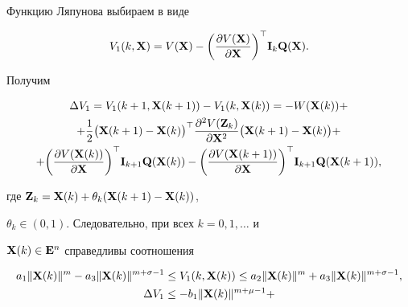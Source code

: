 \begin{pf}


Функцию Ляпунова выбираем в виде


\begin{equation}


V_1(k,\bold X)=V(\bold X)-


\bigg(\frac{\partial V(\bold X)}{\partial \bold X}\bigg)^\top \bold I_k


\bold Q(\bold X).


\end{equation}


Получим


\begin{multline*}


\Delta V_1=V_1(k+1, \bold X(k+1))-V_1(k, \bold X(k))=-W(\bold X(k))+\\


%


+\frac12 \big(\bold X(k+1)-\bold X(k)


\big)^\top \frac {\partial^2 V(\bold Z_k)}


{\partial \bold X^2}\big(\bold X(k+1)-\bold X(k) \big)+\\


%


+\bigg(\frac{\partial V(\bold X(k))}{\partial \bold X}\bigg)^\top


\bold I_{k+1} \bold Q(\bold X(k))-\bigg(\frac{\partial


V(\bold X(k+1))}{\partial \bold X}\bigg)^\top


\bold I_{k+1} \bold Q(\bold X(k+1)),


\end{multline*}


где $\bold Z_k= \bold X(k)+\theta_k (\bold X(k+1)-\bold X(k))$,


$\theta_k\in (0, 1)$. Следовательно, при всех $k=0,1,\dotsc$ и


$\bold X(k)\in \bold E^n$ справедливы соотношения


\begin{gather*}


a_1 \|\bold X(k)\|^{m}-a_3


\|\bold X(k)\|^{m+\sigma-1}\leq V_1(k, \bold X(k))\leq


a_2 \|\bold X(k)\|^{m}+a_3\|\bold X(k)\|^{m+\sigma-1},\\


%


\Delta V_1\leq -b_1 \|\bold X(k)\|^{m+\mu-1}+



\end{gather*}
\end{pf}
